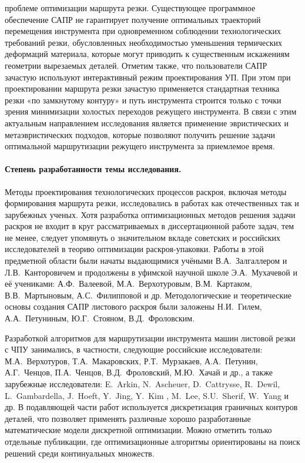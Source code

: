 \documentclass[14pt]{extarticle}
\begin{document}
проблеме оптимизации маршрута резки. 
Существующее программное обеспечение САПР не гарантирует 
получение оптимальных траекторий перемещения инструмента 
при одновременном соблюдении технологических требований резки, 
обусловленных необходимостью уменьшения термических деформаций материала, 
которые могут приводить к существенным искажениям геометрии вырезаемых деталей. 
Отметим также, что пользователи САПР зачастую используют интерактивный режим проектирования УП. 
При этом при проектировании маршрута резки зачастую применяется 
стандартная техника резки «по замкнутому контуру» и путь инструмента строится 
только с точки зрения минимизации холостых переходов режущего инструмента.
В связи с этим актуальным направлением
исследования является применение эвристических и метаэвристических подходов,
которые позволяют получить решение задачи
оптимальной маршрутизации
режущего инструмента
за приемлемое время.

\paragraph*{Степень разработанности темы исследования.}

Методы проектирования технологических процессов раскроя, 
включая методы формирования маршрута резки, исследовались в работах как отечественных так и зарубежных ученых. 
Хотя разработка оптимизационных методов решения задачи раскроя не входит в круг рассматриваемых в диссертационной работе задач, 
тем не менее, следует упомянуть о значительном вкладе советских и российских исследователей 
в теорию оптимизации раскроя-упаковки. 
Работы в этой предметной области были начаты выдающимися учёными 
В.А.~Залгаллером и Л.В.~Канторовичем  
и продолжены в уфимской научной школе 
Э.А.~Мухачевой и её учениками: 
А.Ф.~Валеевой, М.А.~Верхотуровым, В.М.~Картаком, В.В.~Мартыновым, А.С.~Филипповой и др. 
Методологические и теоретические основы создания САПР листового раскроя были заложены 
Н.И.~Гилем, А.А.~Петуниным, Ю.Г.~Стояном, В.Д.~Фроловским.

Разработкой алгоритмов для маршрутизации инструмента машин листовой резки с ЧПУ занимались, 
в частности, следующие российские исследователи: 
М.А.~Верхотуров, Т.А.~Макаровских, Р.Т.~Мурзакаев, А.А.~Петунин, А.Г.~Ченцов,
П.А.~Ченцов, В.Д.~Фроловский, М.Ю.~Хачай и др., 
а также зарубежные исследователи: 
E.~Arkin, N.~Ascheuer, D.~Cattrysse, R.~Dewil, L.~Gambardella, J.~Hoeft, Y.~Jing, Y.~Kim , M.~Lee, S.U.~Sherif, W.~Yang и др.
В подавляющей части работ
используется дискретизация граничных контуров деталей, 
что позволяет применять различные хорошо разработанные математические модели дискретной оптимизации. 
Можно отметить только отдельные публикации, 
где оптимизационные алгоритмы ориентированы на поиск решений среди континуальных множеств.
\end{document}
